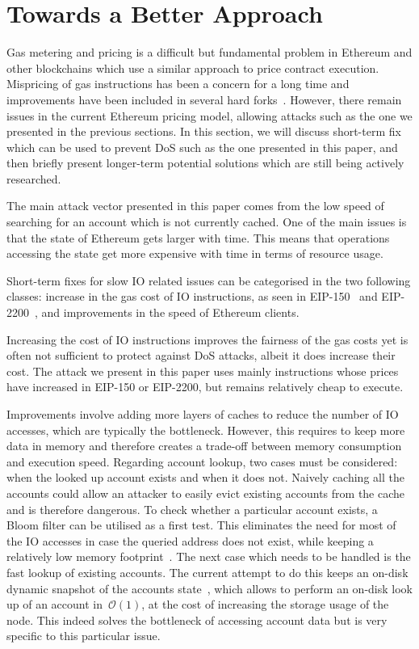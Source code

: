 \section{Towards a Better Approach}
\label{sec:design}

Gas metering and pricing is a difficult but fundamental problem in Ethereum and other blockchains which use a similar approach to price contract execution. Mispricing of gas instructions has been a concern for a long time and improvements have been included in several hard forks~\cite{erc150,eip2200}. However, there remain issues in the current Ethereum pricing model, allowing attacks such as the one we presented in the previous sections. In this section, we will discuss short-term fix which can be used to prevent DoS such as the one presented in this paper, and then briefly present longer-term potential solutions which are still being actively researched. 

The main attack vector presented in this paper comes from the low speed of searching for an account which is not currently cached. One of the main issues is that the state of Ethereum gets larger with time. This means that operations accessing the state get more expensive with time in terms of resource usage.

Short-term fixes for slow IO related issues can be categorised in the two following classes: increase in the gas cost of IO instructions, as seen in EIP-150~\cite{erc150} and EIP-2200~\cite{eip2200}, and improvements in the speed of Ethereum clients.

Increasing the cost of IO instructions improves the fairness of the gas costs yet is often not sufficient to protect against DoS attacks, albeit it does increase their cost. The attack we present in this paper uses mainly instructions whose prices have increased in EIP-150 or EIP-2200, but remains relatively cheap to execute.

Improvements involve adding more layers of caches to reduce the number of IO accesses, which are typically the bottleneck. However, this requires to keep more data in memory and therefore creates a trade-off between memory consumption and execution speed. Regarding account lookup, two cases must be considered: when the looked up account exists and when it does not. Naively caching all the accounts could allow an attacker to easily evict existing accounts from the cache and is therefore dangerous. To check whether a particular account exists, a Bloom filter can be utilised as a first test. This eliminates the need for most of the IO accesses in case the queried address does not exist, while keeping a relatively low memory footprint~\cite{mitzenmacher2002compressed}. The next case which needs to be handled is the fast lookup of existing accounts. The current attempt to do this keeps an on-disk dynamic snapshot of the accounts state~\cite{dynamic-trie-snapshot-pr}, which allows to perform an on-disk look up of an account in~$\mathcal{O}(1)$, at the cost of increasing the storage usage of the node. This indeed solves the bottleneck of accessing account data but is very specific to this particular issue.

